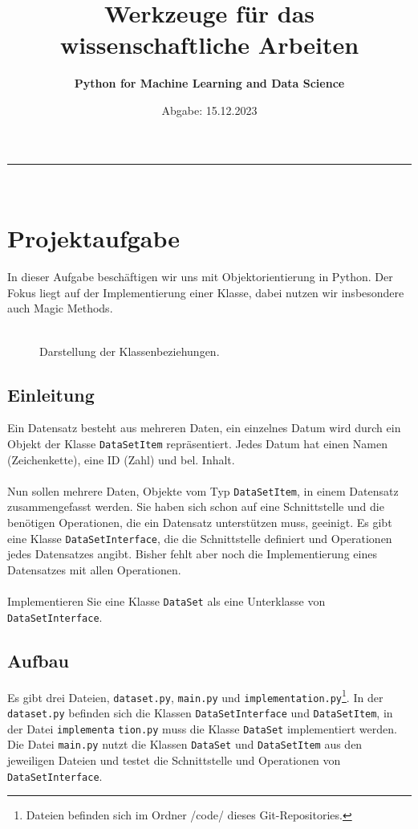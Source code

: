 \documentclass[11pt]{article}
\title{\vspace{-50pt}\bf{Werkzeuge für das wissenschaftliche Arbeiten}\vspace{-15pt}}}
\author{\vspace{-10pt}\bf{Python for Machine Learning and Data Science}}
\date{\vspace{-10pt}Abgabe: 15.12.2023}
\begin{document}
\maketitle

\hrule\hfill\\[0.2cm]

\tableofcontents

\section{Projektaufgabe}
In dieser Aufgabe beschäftigen wir uns mit Objektorientierung in Python.
Der Fokus liegt auf der Implementierung einer Klasse, dabei nutzen wir insbesondere auch Magic Methods.\\
\\
\begin{figure}[h]
    \centering
    
    \caption{Darstellung der Klassenbeziehungen.}
    \label{fig:classes-files}
\end{figure} 

\subsection{Einleitung}
Ein Datensatz besteht aus mehreren Daten, ein einzelnes Datum wird durch ein Objekt der Klasse \texttt{DataSetItem} repräsentiert. 
Jedes Datum hat einen Namen (Zeichenkette), eine ID (Zahl) und bel. Inhalt. \\
\\ 
Nun sollen mehrere Daten, Objekte vom Typ \texttt{DataSetItem}, in einem Datensatz zusammengefasst werden.
Sie haben sich schon auf eine Schnittstelle und die benötigen Operationen, die ein Datensatz unterstützen muss, geeinigt.
Es gibt eine Klasse \texttt{DataSetInterface}, die die Schnittstelle definiert und Operationen jedes Datensatzes angibt.
Bisher fehlt aber noch die Implementierung eines Datensatzes mit allen Operationen.\\
\\
Implementieren Sie eine Klasse \texttt{DataSet} als eine Unterklasse von \texttt{DataSetInterface}.\\

\subsection{Aufbau}
Es gibt drei Dateien, \texttt{dataset.py}, \texttt{main.py} und \texttt{implementation.py}\footnote{Dateien befinden sich im Ordner /code/ dieses Git-Repositories.}. In der \texttt{dataset.py} befinden sich die Klassen \texttt{DataSetInterface} und \texttt{DataSetItem}, in der Datei \texttt{implementa} \texttt{tion.py} muss die Klasse \texttt{DataSet} implementiert werden. Die Datei \texttt{main.py} nutzt die Klassen \texttt{DataSet} und \texttt{DataSetItem} aus den jeweiligen Dateien und testet die Schnittstelle und Operationen von \texttt{DataSetInterface}.\\
\end{document}
